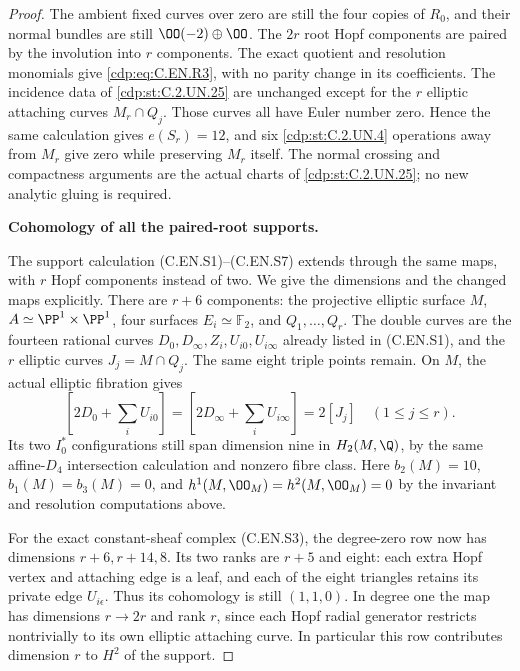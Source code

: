 \begin{proof}
The ambient fixed curves over zero
are still the four copies of $R_0$,
and their normal bundles are still
$\OO(-2)\oplus\OO$. The $2r$
root Hopf components are paired
by the involution into $r$ components.
The exact quotient and resolution
monomials give \eqref{cdp:eq:C.EN.R3}, with no
parity change in its coefficients.
The incidence data of \ref{cdp:st:C.2.UN.25} are
unchanged except for the $r$
elliptic attaching curves $M_r\cap Q_j$.
Those curves all have Euler number
zero. Hence the same calculation
gives $e(S_r)=12$, and six \ref{cdp:st:C.2.UN.4}
operations away from $M_r$ give
zero while preserving $M_r$ itself.
The normal crossing and compactness
arguments are the actual charts
of \ref{cdp:st:C.2.UN.25}; no new analytic gluing
is required.

\par\medskip\noindent\textbf{Cohomology of all the paired-root supports.}\par\noindent
The support calculation (C.EN.S1)--(C.EN.S7) extends through
the same maps, with $r$ Hopf components instead of two.
We give the dimensions and the changed maps explicitly.
There are $r+6$ components: the projective elliptic surface
$M$, $A\simeq\PP^1\times\PP^1$, four surfaces
$E_i\simeq\mathbb F_2$, and $Q_1,\ldots,Q_r$.
The double curves are the fourteen rational curves
$D_0,D_\infty,Z_i,U_{i0},U_{i\infty}$ already listed
in (C.EN.S1), and the $r$ elliptic curves
$J_j=M\cap Q_j$. The same eight triple points remain.
On $M$, the actual elliptic fibration gives
\[
 [2D_0+\textstyle\sum_iU_{i0}]
 =[2D_\infty+\textstyle\sum_iU_{i\infty}]
 =2[J_j]\quad(1\le j\le r).
                                                               \tag{C.EN.G1}\label{cdp:eq:C.EN.G1}
\]
Its two $I_0^*$ configurations still span dimension nine
in $H_2(M,\Q)$, by the same affine-$D_4$ intersection
calculation and nonzero fibre class. Here $b_2(M)=10$,
$b_1(M)=b_3(M)=0$, and $h^1(M,\OO_M)=h^2(M,\OO_M)=0$
by the invariant and resolution computations above.

For the exact constant-sheaf complex (C.EN.S3), the
degree-zero row now has dimensions
$r+6,r+14,8$. Its two ranks are $r+5$ and eight:
each extra Hopf vertex and attaching edge is a leaf,
and each of the eight triangles retains its private
edge $U_{i\epsilon}$. Thus its cohomology is still
$(1,1,0)$. In degree one the map has dimensions
$r\to2r$ and rank $r$, since each Hopf radial
generator restricts nontrivially to its own elliptic
attaching curve. In particular this row contributes
dimension $r$ to $H^2$ of the support.


\end{proof}
